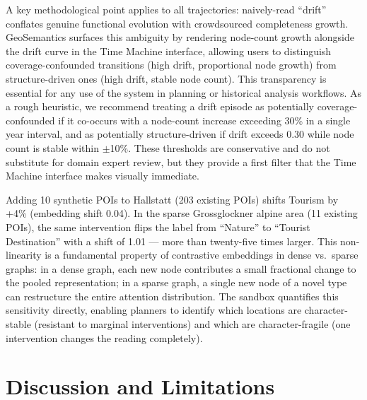 \documentclass[]{interact}
\theoremstyle{plain}%
\theoremstyle{definition}
\theoremstyle{remark}
\begin{document}
A key methodological point applies to all trajectories: naively-read ``drift'' conflates genuine functional evolution with crowdsourced completeness growth. GeoSemantics surfaces this ambiguity by rendering node-count growth alongside the drift curve in the Time Machine interface, allowing users to distinguish coverage-confounded transitions (high drift, proportional node growth) from structure-driven ones (high drift, stable node count). This transparency is essential for any use of the system in planning or historical analysis workflows. As a rough heuristic, we recommend treating a drift episode as potentially coverage-confounded if it co-occurs with a node-count increase exceeding 30\% in a single year interval, and as potentially structure-driven if drift exceeds 0.30 while node count is stable within $\pm$10\%. These thresholds are conservative and do not substitute for domain expert review, but they provide a first filter that the Time Machine interface makes visually immediate.

Adding 10 synthetic POIs to Hallstatt (203 existing POIs) shifts Tourism by +4\% (embedding shift 0.04). In the sparse Grossglockner alpine area (11 existing POIs), the same intervention flips the label from ``Nature'' to ``Tourist Destination'' with a shift of 1.01 --- more than twenty-five times larger. This non-linearity is a fundamental property of contrastive embeddings in dense vs.\ sparse graphs: in a dense graph, each new node contributes a small fractional change to the pooled representation; in a sparse graph, a single new node of a novel type can restructure the entire attention distribution. The sandbox quantifies this sensitivity directly, enabling planners to identify which locations are character-stable (resistant to marginal interventions) and which are character-fragile (one intervention changes the reading completely).

\section{Discussion and Limitations}
\label{sec:discussion}
\end{document}
